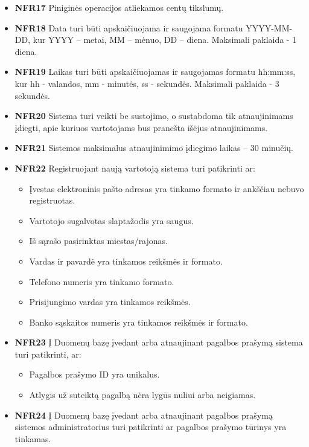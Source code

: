 \documentclass{VUMIFPSbakalaurinis}
\begin{document}
\begin{itemize}
	\item \textbf{NFR17} Piniginės operacijos atliekamos centų tikslumų.
	\item \textbf{NFR18} Data turi būti apskaičiuojama ir saugojama formatu YYYY-MM-DD, kur YYYY – metai, MM – mėnuo, DD – diena. Maksimali paklaida - 1 diena.
	\item \textbf{NFR19} Laikas turi būti apskaičiuojamas ir saugojamas formatu hh:mm:ss, kur hh - valandos, mm - minutės, ss - sekundės. Maksimali paklaida - 3 sekundės.
\end{itemize}

\begin{itemize}
	\item \textbf{NFR20} Sistema turi veikti be sustojimo, o sustabdoma tik atnaujinimams įdiegti, apie kuriuos vartotojams bus pranešta išėjus atnaujinimams.
	\item \textbf{NFR21} Sistemos maksimalus atnaujinimimo įdiegimo laikas – 30 minučių.
	\item \textbf{NFR22} Registruojant naują vartotoją sistema turi patikrinti ar:
	\begin{itemize}
		\item Įvestas elektroninis pašto adresas yra tinkamo formato ir ankščiau nebuvo registruotas.
		\item Vartotojo sugalvotas slaptažodis yra saugus.
		\item Iš sąrašo pasirinktas miestas/rajonas.
		\item Vardas ir pavardė yra tinkamos reikšmės ir formato.
		\item Telefono numeris yra tinkamo formato.
		\item Prisijungimo vardas yra tinkamos reikšmės.
		\item Banko sąskaitos numeris yra tinkamos reikšmės ir formato.
	\end{itemize}
	\item \textbf{NFR23} Į Duomenų bazę įvedant arba atnaujinant pagalbos prašymą sistema turi patikrinti, ar:
	\begin{itemize}
		\item Pagalbos prašymo ID yra unikalus.
		\item Atlygis už suteiktą pagalbą nėra lygūs nuliui arba neigiamas.
	\end{itemize}
	\item \textbf{NFR24} Į Duomenų bazę įvedant arba atnaujinant pagalbos prašymą sistemos administratorius turi patikrinti ar pagalbos prašymo tūrinys yra tinkamas.
\end{itemize}
\end{document}

